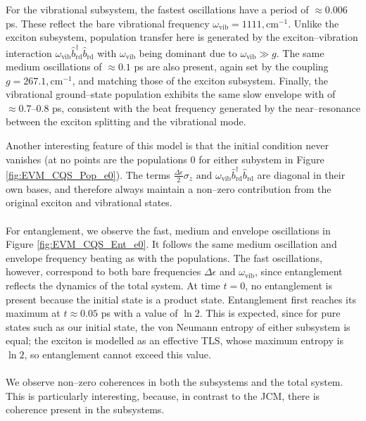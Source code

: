 \documentclass[11pt]{article}
\begin{document}
For the vibrational subsystem, the fastest oscillations have a period of $\approx0.006$ ps. These reflect the bare vibrational frequency $\omega_{\scriptscriptstyle \text{vib}} = 1111,\text{cm}^{-1}$. Unlike the exciton subsystem, population transfer here is generated by the exciton--vibration interaction $\omega_{\scriptscriptstyle \text{vib}} \hat{b}_{\scriptscriptstyle \text{rd}}^\dagger \hat{b}_{\scriptscriptstyle \text{rd}}$ with $\omega_{\scriptscriptstyle \text{vib}}$ being dominant due to $\omega_{\scriptscriptstyle \text{vib}}\gg g$. The same medium oscillations of $\approx0.1$ ps are also present, again set by the coupling $g = 267.1,\text{cm}^{-1}$, and matching those of the exciton subsystem. Finally, the vibrational ground–state population exhibits the same slow envelope with of $\approx0.7$–$0.8$ ps, consistent with the beat frequency generated by the near--resonance between the exciton splitting and the vibrational mode.

Another interesting feature of this model is that the initial condition never vanishes (at no points are the populations 0 for either subystem in Figure \ref{fig:EVM_CQS_Pop_e0}). The terms $\frac{\Delta\epsilon}{2}\sigma_z\text{ and } \omega_{\scriptscriptstyle \text{vib}}\hat{b}_{\scriptscriptstyle \text{rd}}^\dagger\hat{b}_{\scriptscriptstyle \text{rd}}$ are diagonal in their own bases, and therefore always maintain a non--zero contribution from the original exciton and vibrational states.\\
\\
For entanglement, we observe the fast, medium and envelope oscillations in Figure \ref{fig:EVM_CQS_Ent_e0}. It follows the same medium oscillation and envelope frequency beating as with the populations. The fast oscillations, however, correspond to both bare frequencies $\Delta\epsilon$ and $\omega_{\scriptscriptstyle \text{vib}}$, since entanglement reflects the dynamics of the total system. At time $t = 0$, no entanglement is present because the initial state is a product state. Entanglement first reaches its maximum at $t \approx 0.05$ ps with a value of $\ln 2$. This is expected, since for pure states such as our initial state, the von Neumann entropy of either subsystem is equal; the exciton is modelled as an effective TLS, whose maximum entropy is $\ln 2$, so entanglement cannot exceed this value.\\
\\
We observe non--zero coherences in both the subsystems and the total system. This is particularly interesting, because, in contrast to the JCM, there is coherence present in the subsystems. 
\end{document}
